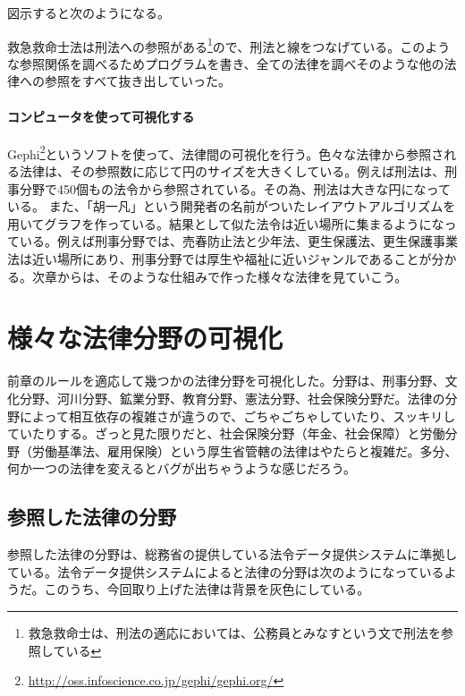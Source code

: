 \documentclass[a5j,openany,twoside]{jsbook}
\begin{document}
図示すると次のようになる。

救急救命士法は刑法への参照がある\footnote{救急救命士は、刑法の適応においては、公務員とみなすという文で刑法を参照している}ので、刑法と線をつなげている。このような参照関係を調べるためプログラムを書き、全ての法律を調べそのような他の法律への参照をすべて抜き出していった。

\subsubsection{コンピュータを使って可視化する}

Gephi\footnote{\url{http://oss.infoscience.co.jp/gephi/gephi.org/}}というソフトを使って、法律間の可視化を行う。色々な法律から参照される法律は、その参照数に応じて円のサイズを大きくしている。例えば刑法は、刑事分野で450個もの法令から参照されている。その為、刑法は大きな円になっている。
また、「胡一凡」という開発者の名前がついたレイアウトアルゴリズムを用いてグラフを作っている。結果として似た法令は近い場所に集まるようになっている。例えば刑事分野では、売春防止法と少年法、更生保護法、更生保護事業法は近い場所にあり、刑事分野では厚生や福祉に近いジャンルであることが分かる。次章からは、そのような仕組みで作った様々な法律を見ていこう。

\chapter{様々な法律分野の可視化}

前章のルールを適応して幾つかの法律分野を可視化した。分野は、刑事分野、文化分野、河川分野、鉱業分野、教育分野、憲法分野、社会保険分野だ。法律の分野によって相互依存の複雑さが違うので、ごちゃごちゃしていたり、スッキリしていたりする。ざっと見た限りだと、社会保険分野（年金、社会保障）と労働分野（労働基準法、雇用保険）という厚生省管轄の法律はやたらと複雑だ。多分、何か一つの法律を変えるとバグが出ちゃうような感じだろう。

\section{参照した法律の分野}

参照した法律の分野は、総務省の提供している法令データ提供システムに準拠している。法令データ提供システムによると法律の分野は次のようになっているようだ。このうち、今回取り上げた法律は背景を灰色にしている。
\end{document}

